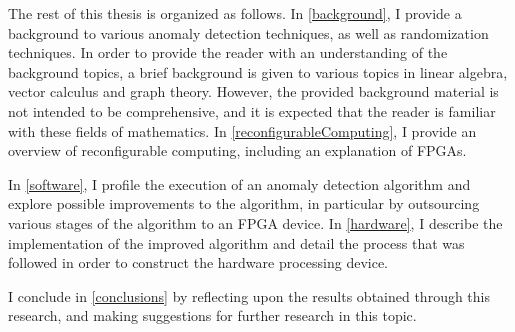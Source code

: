 The rest of this thesis is organized as follows. In \autoref{background}, I
provide a background to various anomaly detection techniques, as well as
randomization techniques. In order to provide the reader with an understanding
of the background topics, a brief background is given to various topics in
linear algebra, vector calculus and graph theory. However, the provided
background material is not intended to be comprehensive, and it is expected that
the reader is familiar with these fields of mathematics. In
\autoref{reconfigurableComputing}, I provide an overview of reconfigurable
computing, including an explanation of \glspl{FPGA}.

In \autoref{software}, I profile the execution of an anomaly detection algorithm
and explore possible improvements to the algorithm, in particular by outsourcing
various stages of the algorithm to an FPGA device. In \autoref{hardware},
I describe the implementation of the improved algorithm and detail the process
that was followed in order to construct the hardware processing device.
\begin{comment}
In
\autoref{results}, I record results obtained by benchmarking the device that was
previously designed and constructed, and comparing the expected improvements to
the algorithm's execution with the measured results.
\end{comment}

I conclude in \autoref{conclusions} by reflecting upon the results obtained
through this research, and making suggestions for further research in this
topic.
